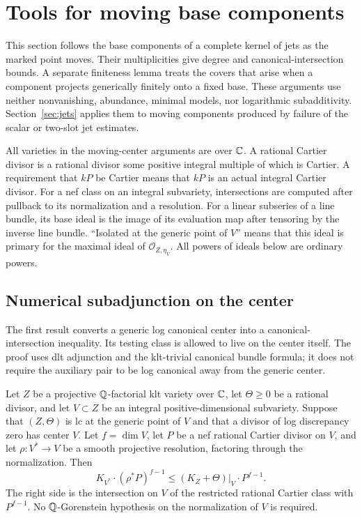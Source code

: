 \section{Tools for moving base components}
\label{sec:common-tools}

This section follows the base components of a complete kernel of jets
as the marked point moves. Their multiplicities give degree and
canonical-intersection bounds. A separate finiteness lemma treats the
covers that arise when a component projects generically finitely onto
a fixed base. These arguments use neither nonvanishing, abundance,
minimal models, nor logarithmic subadditivity.
Section~\ref{sec:jets} applies them to moving components produced by
failure of the scalar or two-slot jet estimates.

All varieties in the moving-center arguments are over $\mathbb{C}$.
A rational Cartier divisor is a rational divisor some positive
integral multiple of which is Cartier. A requirement that $kP$
be Cartier means that $kP$ is an actual integral Cartier divisor.
For a nef
class on an integral subvariety, intersections are computed after
pullback to its normalization and a resolution. For a linear
subseries of a line bundle, its base ideal is the image of its
evaluation map after tensoring by the inverse line bundle.
``Isolated at the generic point of $V$'' means that this ideal
is primary for the maximal ideal of $\mathcal O_{Z,\eta_V}$.
All powers of ideals below are ordinary powers.

\subsection{Numerical subadjunction on the center}

The first result converts a generic log canonical center into a
canonical-intersection inequality. Its testing class is allowed
to live on the center itself. The proof uses dlt adjunction and
the klt-trivial canonical bundle formula; it does not require the
auxiliary pair to be log canonical away from the generic center.

\begin{lemma}
\label{common:numerical-subadjunction}
Let $Z$ be a projective $\mathbb{Q}$-factorial klt variety over $\mathbb{C}$, let
$\Theta\geq0$ be a rational divisor, and let $V\subset Z$ be an
integral positive-dimensional subvariety. Suppose that $(Z,\Theta)$
is lc at the generic point of $V$ and that a divisor of log
discrepancy zero has center $V$. Let $f=\dim V$, let $P$ be a nef
rational Cartier divisor on $V$, and let $\rho:V^*\to V$ be a smooth
projective resolution, factoring through the normalization. Then
\begin{equation}
\label{common:subadjunction-inequality}
 K_{V^*}\cdot(\rho^*P)^{f-1}
 \leq (K_Z+\Theta)|_V\cdot P^{f-1}.
\end{equation}
The right side is the intersection on $V$ of the restricted
rational Cartier class with $P^{f-1}$. No $\mathbb{Q}$-Gorenstein hypothesis
on the normalization of $V$ is required.
\end{lemma}

